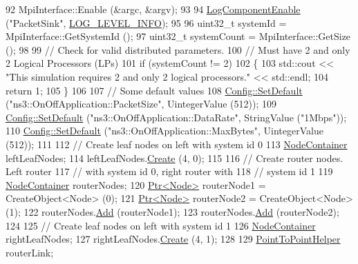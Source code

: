 \begin{DoxyCode}
92   MpiInterface::Enable (&argc, &argv);
93 
94   \hyperlink{namespacens3_adc4ef4f00bb2f5f4edae67fc3bc27f20}{LogComponentEnable} (\textcolor{stringliteral}{"PacketSink"}, \hyperlink{namespacens3_aa6464a4d69551a9cc968e17a65f39bdbae36aedc880de94fd5a5b53bb9fe65628}{LOG\_LEVEL\_INFO});
95 
96   uint32\_t systemId = MpiInterface::GetSystemId ();
97   uint32\_t systemCount = MpiInterface::GetSize ();
98 
99   \textcolor{comment}{// Check for valid distributed parameters.}
100   \textcolor{comment}{// Must have 2 and only 2 Logical Processors (LPs)}
101   \textcolor{keywordflow}{if} (systemCount != 2)
102     \{
103       std::cout << \textcolor{stringliteral}{"This simulation requires 2 and only 2 logical processors."} << std::endl;
104       \textcolor{keywordflow}{return} 1;
105     \}
106 
107   \textcolor{comment}{// Some default values}
108   \hyperlink{group__config_ga2e7882df849d8ba4aaad31c934c40c06}{Config::SetDefault} (\textcolor{stringliteral}{"ns3::OnOffApplication::PacketSize"}, UintegerValue (512));
109   \hyperlink{group__config_ga2e7882df849d8ba4aaad31c934c40c06}{Config::SetDefault} (\textcolor{stringliteral}{"ns3::OnOffApplication::DataRate"}, StringValue (\textcolor{stringliteral}{"1Mbps"}));
110   \hyperlink{group__config_ga2e7882df849d8ba4aaad31c934c40c06}{Config::SetDefault} (\textcolor{stringliteral}{"ns3::OnOffApplication::MaxBytes"}, UintegerValue (512));
111 
112   \textcolor{comment}{// Create leaf nodes on left with system id 0}
113   \hyperlink{classns3_1_1NodeContainer}{NodeContainer} leftLeafNodes;
114   leftLeafNodes.\hyperlink{classns3_1_1NodeContainer_a787f059e2813e8b951cc6914d11dfe69}{Create} (4, 0);
115 
116   \textcolor{comment}{// Create router nodes.  Left router}
117   \textcolor{comment}{// with system id 0, right router with}
118   \textcolor{comment}{// system id 1}
119   \hyperlink{classns3_1_1NodeContainer}{NodeContainer} routerNodes;
120   \hyperlink{classns3_1_1Ptr}{Ptr<Node>} routerNode1 = CreateObject<Node> (0);
121   \hyperlink{classns3_1_1Ptr}{Ptr<Node>} routerNode2 = CreateObject<Node> (1);
122   routerNodes.\hyperlink{classns3_1_1NodeContainer_aa60b3a0e70f2fb324e16ffcf8bf31fcb}{Add} (routerNode1);
123   routerNodes.\hyperlink{classns3_1_1NodeContainer_aa60b3a0e70f2fb324e16ffcf8bf31fcb}{Add} (routerNode2);
124 
125   \textcolor{comment}{// Create leaf nodes on left with system id 1}
126   \hyperlink{classns3_1_1NodeContainer}{NodeContainer} rightLeafNodes;
127   rightLeafNodes.\hyperlink{classns3_1_1NodeContainer_a787f059e2813e8b951cc6914d11dfe69}{Create} (4, 1);
128 
129   \hyperlink{classns3_1_1PointToPointHelper}{PointToPointHelper} routerLink;

\end{DoxyCode}
